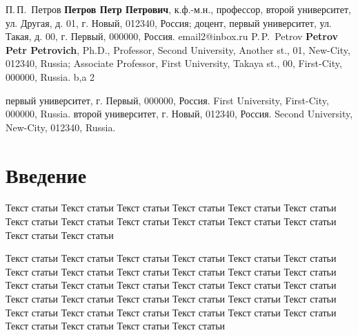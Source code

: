 \Author%
{П.\,П.~Петров}%
{\textbf{Петров Петр Петрович}, к.ф.-м.н., профессор,  второй университет, ул. Другая, д. 01, г. Новый, 012340, Россия; доцент, первый университет, ул. Такая, д. 00, г. Первый, 000000, Россия.}
{email2@inbox.ru} %
{P.\,P.~Petrov} %
{\textbf{Petrov Petr Petrovich}, Ph.D., Professor, Second University, Another st., 01, New-City, 012340, Russia; Associate Professor, First University, Takaya st., 00, First-City, 000000, Russia.}
{b,a} %
{2} %

				{первый университет, г. Первый, 000000, Россия.}%
				{First University, First-City, 000000, Russia.}%
				{второй университет, г. Новый, 012340, Россия.} %
				{Second University,  New-City, 012340, Russia.} %


\newcommand{\pX}{{\mathcal X}}
\let\msf=\mathsf
\newcommand{\var}{\mathop{\sf Var}}



	\Header
	\captionsenglish
	\SubHeader
	\captionsrussian

\section*{Введение}

Текст статьи Текст статьи Текст статьи Текст статьи Текст статьи Текст статьи Текст статьи Текст статьи Текст статьи Текст статьи Текст статьи Текст статьи Текст статьи Текст статьи 

Текст статьи Текст статьи Текст статьи Текст статьи Текст статьи Текст статьи Текст статьи Текст статьи Текст статьи Текст статьи Текст статьи Текст статьи Текст статьи Текст статьи Текст статьи Текст статьи Текст статьи Текст статьи Текст статьи Текст статьи Текст статьи Текст статьи Текст статьи Текст статьи Текст статьи Текст статьи Текст статьи Текст статьи Текст статьи Текст статьи Текст статьи Текст статьи Текст статьи Текст статьи 

